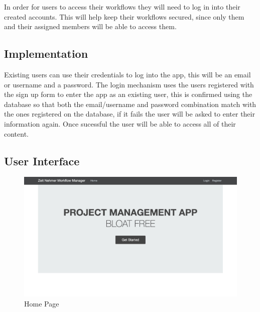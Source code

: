 \documentclass{article}[draft]
\begin{document}
  In order for users to access their workflows they will need to log in into their created accounts. This will help keep their workflows secured, since only them and their assigned members will be able to access them.

  \subsection{Implementation}

  Existing users can use their credentials to log into the app, this will be an email or username and a password. The login mechanism uses the users registered with the sign up form to enter the app as an existing user, this is confirmed using the database so that both the email/username and password combination match with the ones registered on the database, if it fails the user will be asked to enter their information again. Once sucessful the user will be able to access all of their content.

  \subsection{User Interface}
\vspace{45}
    \begin{figure}[h!]
         \centering
          \includegraphics[width=1.2\columnwidth]{Images/homepage.jpg}
          \caption{Home Page}
          \label{fig:figure 3}
    \end{figure}
\end{document}
